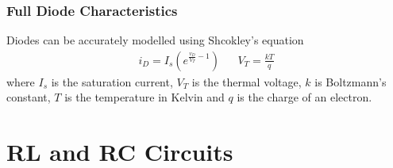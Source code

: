 \documentclass[oneside]{book}
\begin{document}
                \subsection{Full Diode Characteristics}
                    Diodes can be accurately modelled using Shcokley's equation
                    \begin{align*}
                        i_D = I_s \left( e^{\frac{v_D}{V_T} -1} \right) && V_T = \frac{kT}{q}
                    \end{align*}
                    where $I_s$ is the saturation current, $V_T$ is the thermal voltage, $k$ is Boltzmann's constant, $T$ is the temperature in Kelvin and $q$ is the charge of an electron.
        \chapter{RL and RC Circuits}
\end{document}

